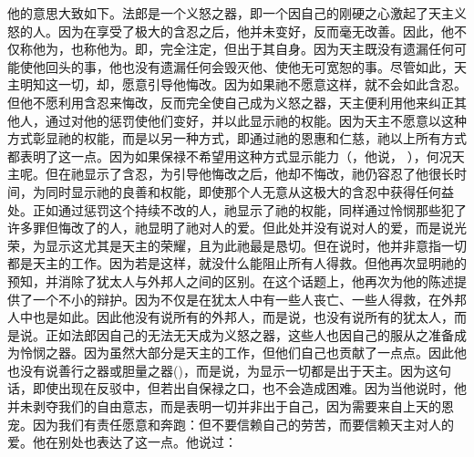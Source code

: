 他的意思大致如下。法郎是一个义怒之器，即一个因自己的刚硬之心激起了天主义怒的人。因为在享受了极大的含忍之后，他并未变好，反而毫无改善。因此，他不仅称他为，也称他为。即，完全注定，但出于其自身。因为天主既没有遗漏任何可能使他回头的事，他也没有遗漏任何会毁灭他、使他无可宽恕的事。尽管如此，天主明知这一切，却，愿意引导他悔改。因为如果祂不愿意这样，就不会如此含忍。但他不愿利用含忍来悔改，反而完全使自己成为义怒之器，天主便利用他来纠正其他人，通过对他的惩罚使他们变好，并以此显示祂的权能。因为天主不愿意以这种方式彰显祂的权能，而是以另一种方式，即通过祂的恩惠和仁慈，祂以上所有方式都表明了这一点。因为如果保禄不希望用这种方式显示能力（，他说， ），何况天主呢。但在祂显示了含忍，为引导他悔改之后，他却不悔改，祂仍容忍了他很长时间，为同时显示祂的良善和权能，即使那个人无意从这极大的含忍中获得任何益处。正如通过惩罚这个持续不改的人，祂显示了祂的权能，同样通过怜悯那些犯了许多罪但悔改了的人，祂显明了祂对人的爱。但此处并没有说对人的爱，而是说光荣，为显示这尤其是天主的荣耀，且为此祂最是恳切。但在说时，他并非意指一切都是天主的工作。因为若是这样，就没什么能阻止所有人得救。但他再次显明祂的预知，并消除了犹太人与外邦人之间的区别。在这个话题上，他再次为他的陈述提供了一个不小的辩护。因为不仅是在犹太人中有一些人丧亡、一些人得救，在外邦人中也是如此。因此他没有说所有的外邦人，而是说，也没有说所有的犹太人，而是说。正如法郎因自己的无法无天成为义怒之器，这些人也因自己的服从之准备成为怜悯之器。因为虽然大部分是天主的工作，但他们自己也贡献了一点点。因此他也没有说善行之器或胆量之器()，而是说，为显示一切都是出于天主。因为这句话，即使出现在反驳中，但若出自保禄之口，也不会造成困难。因为当他说时，他并未剥夺我们的自由意志，而是表明一切并非出于自己，因为需要来自上天的恩宠。因为我们有责任愿意和奔跑：但不要信赖自己的劳苦，而要信赖天主对人的爱。他在别处也表达了这一点。他说过： 